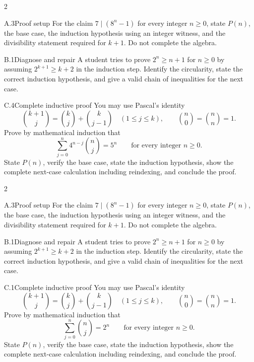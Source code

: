 \documentclass[9pt]{extarticle}
\begin{document}
\CoreWorkArea
\FormBreak
{}
\begin{multicols}{2}
\begin{CompactCoreProblem}{A.3}{Proof setup}
For the claim $7\mid(8^n-1)$ for every integer $n\ge0$, state $P(n)$, the base case, the induction hypothesis using an integer witness, and the divisibility statement required for $k+1$. Do not complete the algebra.
\end{CompactCoreProblem}
\begin{CompactCoreProblem}{B.1}{Diagnose and repair}
A student tries to prove $2^n\ge n+1$ for $n\ge0$ by assuming $2^{k+1}\ge k+2$ in the induction step. Identify the circularity, state the correct induction hypothesis, and give a valid chain of inequalities for the next case.
\end{CompactCoreProblem}
\end{multicols}
\begin{CompactCoreProblem}{C.4}{Complete inductive proof}
You may use Pascal's identity
\[
\binom{k+1}{j}=\binom{k}{j}+\binom{k}{j-1}
\quad(1\le j\le k),\qquad
\binom{n}{0}=\binom{n}{n}=1.
\]
Prove by mathematical induction that
\[
\sum_{j=0}^{n} 4^{n-j}\binom{n}{j}=5^n\qquad\text{for every integer }n\ge0.
\]
State $P(n)$, verify the base case, state the induction hypothesis, show the complete next-case calculation including reindexing, and conclude the proof.
\end{CompactCoreProblem}
\CoreWorkArea
\FormBreak
{}
\begin{multicols}{2}
\begin{CompactCoreProblem}{A.3}{Proof setup}
For the claim $7\mid(8^n-1)$ for every integer $n\ge0$, state $P(n)$, the base case, the induction hypothesis using an integer witness, and the divisibility statement required for $k+1$. Do not complete the algebra.
\end{CompactCoreProblem}
\begin{CompactCoreProblem}{B.1}{Diagnose and repair}
A student tries to prove $2^n\ge n+1$ for $n\ge0$ by assuming $2^{k+1}\ge k+2$ in the induction step. Identify the circularity, state the correct induction hypothesis, and give a valid chain of inequalities for the next case.
\end{CompactCoreProblem}
\end{multicols}
\begin{CompactCoreProblem}{C.1}{Complete inductive proof}
You may use Pascal's identity
\[
\binom{k+1}{j}=\binom{k}{j}+\binom{k}{j-1}
\quad(1\le j\le k),\qquad
\binom{n}{0}=\binom{n}{n}=1.
\]
Prove by mathematical induction that
\[
\sum_{j=0}^{n}\binom{n}{j}=2^n\qquad\text{for every integer }n\ge0.
\]
State $P(n)$, verify the base case, state the induction hypothesis, show the complete next-case calculation including reindexing, and conclude the proof.
\end{CompactCoreProblem}
\end{document}
